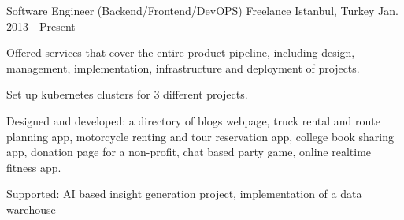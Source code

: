 \begin{cventries}
  \cventry
    {Software Engineer (Backend/Frontend/DevOPS)}
    {Freelance}
    {Istanbul, Turkey}
    {Jan. 2013 - Present}
    {
      \begin{cvitems}
        \item {Offered services that cover the entire product pipeline, including design, management, implementation, infrastructure and deployment of projects.}
        \item {Set up kubernetes clusters for 3 different projects.}
        \item {Designed and developed: a directory of blogs webpage, truck rental and route planning app, motorcycle renting and tour reservation app, college book sharing app, donation page for a non-profit, chat based party game, online realtime fitness app.}
        \item {Supported: AI based insight generation project, implementation of a data warehouse}
      \end{cvitems}
    }    
    


\end{cventries}

